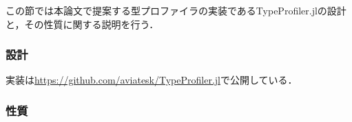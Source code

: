 この節では本論文で提案する型プロファイラの実装であるTypeProfiler.jlの設計と，その性質に関する説明を行う．

\subsubsection{設計} \label{subsubsection:type-profiler-design}



実装は\url{https://github.com/aviatesk/TypeProfiler.jl}で公開している．

\subsubsection{性質}





